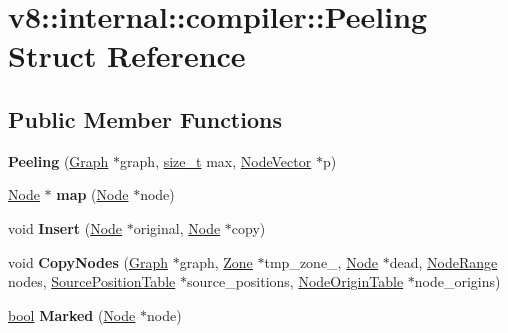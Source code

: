 \hypertarget{structv8_1_1internal_1_1compiler_1_1Peeling}{}\section{v8\+:\+:internal\+:\+:compiler\+:\+:Peeling Struct Reference}
\label{structv8_1_1internal_1_1compiler_1_1Peeling}
\subsection*{Public Member Functions}
\begin{DoxyCompactItemize}
\item 
\mbox{\label{structv8_1_1internal_1_1compiler_1_1Peeling_a5193f8c04beba67b4b246fb517dc8040}} 
{\bfseries Peeling} (\mbox{\hyperlink{classv8_1_1internal_1_1compiler_1_1Graph}{Graph}} $\ast$graph, \mbox{\hyperlink{classsize__t}{size\+\_\+t}} max, \mbox{\hyperlink{classv8_1_1internal_1_1ZoneVector}{Node\+Vector}} $\ast$p)
\item 
\mbox{\label{structv8_1_1internal_1_1compiler_1_1Peeling_aa151de1778d8eb6aa0c3b511f5f3d89c}} 
\mbox{\hyperlink{classv8_1_1internal_1_1compiler_1_1Node}{Node}} $\ast$ {\bfseries map} (\mbox{\hyperlink{classv8_1_1internal_1_1compiler_1_1Node}{Node}} $\ast$node)
\item 
\mbox{\label{structv8_1_1internal_1_1compiler_1_1Peeling_acac7b7d8dbf02394162428357e43f0ae}} 
void {\bfseries Insert} (\mbox{\hyperlink{classv8_1_1internal_1_1compiler_1_1Node}{Node}} $\ast$original, \mbox{\hyperlink{classv8_1_1internal_1_1compiler_1_1Node}{Node}} $\ast$copy)
\item 
\mbox{\label{structv8_1_1internal_1_1compiler_1_1Peeling_a62bfe3375e97dc55dad8ca07c78778c1}} 
void {\bfseries Copy\+Nodes} (\mbox{\hyperlink{classv8_1_1internal_1_1compiler_1_1Graph}{Graph}} $\ast$graph, \mbox{\hyperlink{classv8_1_1internal_1_1Zone}{Zone}} $\ast$tmp\+\_\+zone\+\_\+, \mbox{\hyperlink{classv8_1_1internal_1_1compiler_1_1Node}{Node}} $\ast$dead, \mbox{\hyperlink{classv8_1_1base_1_1iterator__range}{Node\+Range}} nodes, \mbox{\hyperlink{classv8_1_1internal_1_1compiler_1_1SourcePositionTable}{Source\+Position\+Table}} $\ast$source\+\_\+positions, \mbox{\hyperlink{classv8_1_1internal_1_1compiler_1_1NodeOriginTable}{Node\+Origin\+Table}} $\ast$node\+\_\+origins)
\item 
\mbox{\label{structv8_1_1internal_1_1compiler_1_1Peeling_aec3fb6c9cc8bfdad6f0c096438f935be}} 
\mbox{\hyperlink{classbool}{bool}} {\bfseries Marked} (\mbox{\hyperlink{classv8_1_1internal_1_1compiler_1_1Node}{Node}} $\ast$node)
\end{DoxyCompactItemize}
